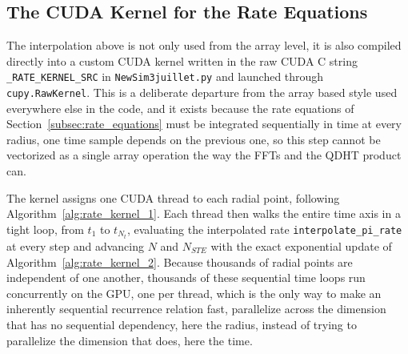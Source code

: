 \subsection{The CUDA Kernel for the Rate Equations}

The interpolation above is not only used from the array level, it is also compiled directly into a custom CUDA kernel written in the raw CUDA C string \texttt{\_RATE\_KERNEL\_SRC} in \texttt{NewSim3juillet.py} and launched through \texttt{cupy.RawKernel}. This is a deliberate departure from the array based style used everywhere else in the code, and it exists because the rate equations of Section~\ref{subsec:rate_equations} must be integrated sequentially in time at every radius, one time sample depends on the previous one, so this step cannot be vectorized as a single array operation the way the FFTs and the QDHT product can.

The kernel assigns one CUDA thread to each radial point, following Algorithm~\ref{alg:rate_kernel_1}. Each thread then walks the entire time axis in a tight loop, from $t_1$ to $t_{N_t}$, evaluating the interpolated rate \texttt{interpolate\_pi\_rate} at every step and advancing $N$ and $N_{STE}$ with the exact exponential update of Algorithm~\ref{alg:rate_kernel_2}. Because thousands of radial points are independent of one another, thousands of these sequential time loops run concurrently on the GPU, one per thread, which is the only way to make an inherently sequential recurrence relation fast, parallelize across the dimension that has no sequential dependency, here the radius, instead of trying to parallelize the dimension that does, here the time.



